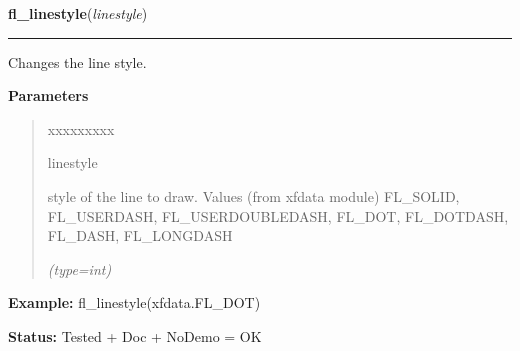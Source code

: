 \hspace{.8\funcindent}\begin{boxedminipage}{\funcwidth}

    \raggedright \textbf{fl\_linestyle}(\textit{linestyle})

    \vspace{-1.5ex}

    \rule{\textwidth}{0.5\fboxrule}
\setlength{\parskip}{2ex}
    Changes the line style.

\setlength{\parskip}{1ex}
      \textbf{Parameters}
      \vspace{-1ex}

      \begin{quote}
        \begin{Ventry}{xxxxxxxxx}

          \item[linestyle]

          style of the line to draw. Values (from xfdata module) FL\_SOLID,
          FL\_USERDASH, FL\_USERDOUBLEDASH, FL\_DOT, FL\_DOTDASH, FL\_DASH,
          FL\_LONGDASH

            {\it (type=int)}

        \end{Ventry}

      \end{quote}

\textbf{Example:} fl\_linestyle(xfdata.FL\_DOT)



\textbf{Status:} Tested + Doc + NoDemo = OK



    \end{boxedminipage}

    \label{xformslib:flxbasic:fl_linestyle}

    \vspace{0.5ex}

